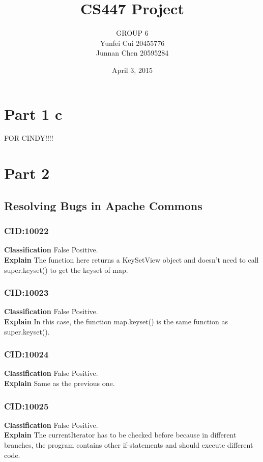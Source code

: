 \documentclass[10pt]{article}
\title{CS447 Project}
\author{GROUP 6\\Yunfei Cui 20455776\\Junnan Chen 20595284}
\date{April 3, 2015}
\begin{document}
\maketitle
\section*{Part 1 c}
FOR CINDY!!!!

\section*{Part 2}
\subsection{Resolving Bugs in Apache Commons}
\subsubsection{CID:10022}
\textbf{Classification}
False Positive.
\\\textbf{Explain} 
The function here returns a KeySetView object and doesn't need to call super.keyset() to get the keyset of map.

\subsubsection{CID:10023}
\textbf{Classification}
False Positive.
\\\textbf{Explain} 
In this case, the function map.keyset() is the same function as super.keyset().

\subsubsection{CID:10024}
\textbf{Classification}
False Positive.
\\\textbf{Explain} 
Same as the previous one.

\subsubsection{CID:10025}
\textbf{Classification}
False Positive.
\\\textbf{Explain} 
The currentIterator has to be checked before because in different branches, the program contains other if-statements and should execute different code.
\end{document}
